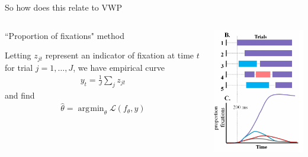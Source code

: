 \documentclass{beamer}
\DeclareMathOperator*{\argmin}{arg\!\min}
\newcommand{\vp}{\vspace{2mm}}
\begin{document}
\begin{frame}{So how does this relate to VWP}

\begin{columns}
\begin{column}{0.45\textwidth}
``Proportion of fixations" method \vp

Letting $z_{jt}$ represent an indicator of fixation at time $t$ for trial $j = 1, \dots, J$, we have empirical curve
\begin{align*}
y_{t} = \frac1J \sum_j z_{jt}
\end{align*}
and find
\begin{align*}
\hat{\theta} = \argmin_{\theta} \mathcal{L}(f_{\theta}, y)
\end{align*}

\end{column}
\begin{column}{0.5\textwidth}  %
\begin{center}
\includegraphics[scale=0.5]{img/bob_aggregate.png}
\end{center}
\end{column}
\end{columns}
\end{frame}
\end{document}
